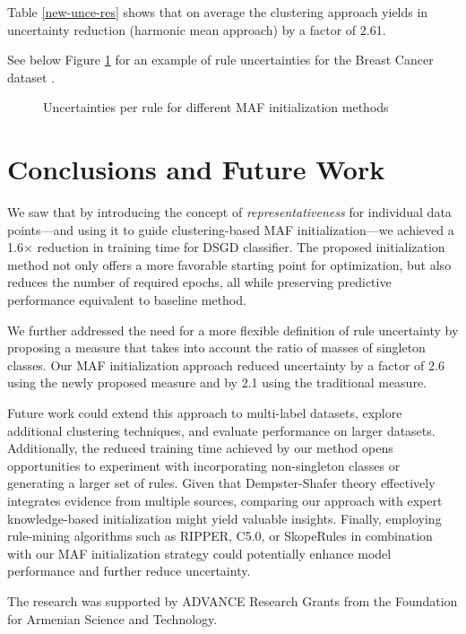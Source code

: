 \documentclass[10pt,a4paper,oneside]{article}
\begin{document}
Table \ref{new-unce-res} shows that on average the clustering approach yields in uncertainty reduction (harmonic mean approach) by a factor of 2.61.

{\color{black}
See below Figure \ref{fig:bars} for an example of rule uncertainties for the Breast Cancer dataset \cite{breastCancer}.
}
\begin{figure}[H]
    \caption{Uncertainties per rule for different MAF initialization methods}
    \label{fig:bars}
\end{figure}


\section{Conclusions and Future Work}\label{4}
We saw that by introducing the concept of \textit{representativeness} for individual data points—and using it to guide clustering-based MAF initialization—we achieved a 1.6× reduction in training time for DSGD classifier. The proposed initialization method not only offers a more favorable starting point for optimization{\color{black},} but also reduces the number of required epochs, all while preserving predictive performance equivalent to baseline method.

We further addressed the need for a more flexible definition of rule uncertainty by proposing a measure that takes into account the ratio of masses of singleton classes. Our MAF initialization approach reduced uncertainty by a factor of 2.6 using the newly proposed measure and by 2.1 using the traditional measure.

{\color{red}
Future work could extend this approach to multi-label datasets, explore additional clustering techniques, and evaluate performance on larger datasets. Additionally, the reduced training time achieved by our method opens opportunities to experiment with incorporating non-singleton classes or generating a larger set of rules. Given that Dempster-Shafer theory effectively integrates evidence from multiple sources, comparing our approach with expert knowledge-based {\color{blue}initialization} might yield valuable insights. Finally, employing rule-mining algorithms such as RIPPER, C5.0, or SkopeRules \cite{ripper, c5, skoperules} in combination with our MAF initialization strategy could potentially enhance model performance and further reduce uncertainty.
}
\begin{Acknowledgements}
The research was supported by ADVANCE Research Grants from the Foundation for Armenian Science and Technology.
\end{Acknowledgements}
\end{document}
